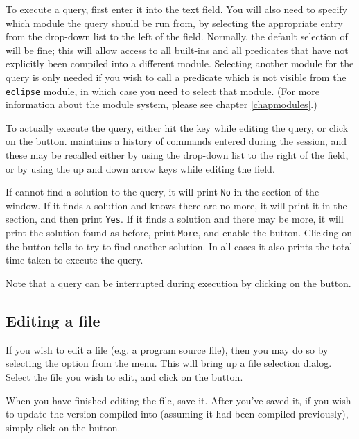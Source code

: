 To execute a query, first enter it into the 
text field.
You will also need to specify which module the query should be run from, by
selecting the appropriate entry from the drop-down list to the left of the
 field.
Normally, the default selection of  will be fine; this will
allow access to all {\eclipse} built-ins and all predicates that have not
explicitly been compiled into a different module.
Selecting another module for the query is only needed if you wish to call a
predicate which is not visible from the {\tt eclipse} module, in which
case you need to select that module.
(For more information about the module system, please see chapter
\ref{chapmodules}.)

To actually execute the query, either hit the  key while
editing the query, or click on the  button.
{\tkeclipse} maintains a history of commands entered during the session, and
these may be recalled either by using the drop-down list to the right of the
 field, or by using the up and down arrow keys while
editing the  field.

If {\eclipse} cannot find a solution to the query, it will print \texttt{No}
in the  section of the {\tkeclipse} window.
If it finds a solution and knows there are no more, it will print it in the
 section, and then print \texttt{Yes}.
If it finds a solution and there may be more, it will print the solution
found as before, print \texttt{More}, and enable the  button.
Clicking on the  button tells {\eclipse} to try to find
another solution.
In all cases it also prints the total time taken to execute the query.

Note that a query can be interrupted during execution by clicking on the
 button.

\subsection{Editing a file}
\label{secedit}

If you wish to edit a file (e.g. a program source file), then you may do so
by selecting the  option from the  menu.
This will bring up a file selection dialog.
Select the file you wish to edit, and click on the  button.

When you have finished editing the file, save it.
After you've saved it, if you wish to update the version compiled into
{\eclipse} (assuming it had been compiled previously), simply click on the
 button.


